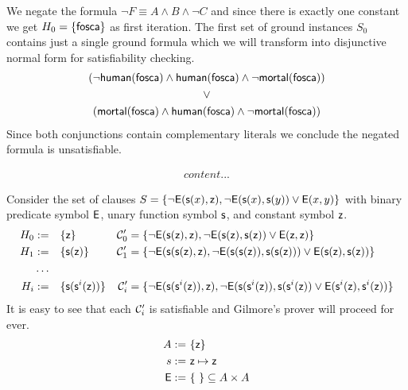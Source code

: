

	We negate the formula $\lnot F \equiv A\land B \land\lnot C$ and since there is exactly one constant we get
	$H_0 = \{ \mathsf{fosca} \}$ as first iteration. The first set of ground instances $S_0$ contains just a single ground formula
	which we will transform into 
	disjunctive normal form for satisfiability checking.
%
\begin{gather*}
(\lnot\mathsf{human}(\mathsf{fosca})\land\mathsf{human}(\mathsf{fosca})\land\lnot\mathsf{mortal}(\mathsf{fosca}))
\\ 
\lor
\\ 
(\mathsf{mortal}(\mathsf{fosca})\land\mathsf{human}(\mathsf{fosca})\land\lnot\mathsf{mortal}(\mathsf{fosca}))
\end{gather*}
Since both conjunctions contain complementary literals we conclude the negated formula is unsatisfiable.


\begin{gather*}
content...
\end{gather*}


\begin{example}
	Consider the set of clauses 
	$S = \{ 
	\lnot{\mathsf{E}}({\mathsf s}(x), {\mathsf z}), 
	\lnot {\mathsf{E}}({\mathsf s}(x), {\mathsf s}(y)) \lor {\mathsf{E}}(x,y)
	\}$ with binary predicate symbol ${\mathsf{E}}$, unary function symbol ${\mathsf s}$, and constant symbol ${\mathsf z}$.
	\begin{align*}
	H_0 :=&\quad \{ {\mathsf z} \} & {\mathcal C}_0' &= \{  
	\lnot{\mathsf{E}}({\mathsf s}({\mathsf z}), {\mathsf z}), 
	\lnot {\mathsf{E}}({\mathsf s}({\mathsf z}), {\mathsf s}({\mathsf z})) \lor {\mathsf{E}}({\mathsf z},{\mathsf z})
	\}
	\\
	H_1 :=&\quad \{ {\mathsf s}({\mathsf z}) \} & {\mathcal C}_1' &= \{ 
		\lnot{\mathsf{E}}({\mathsf s}({\mathsf s}({\mathsf z}), {\mathsf z}),
		\lnot {\mathsf{E}}({\mathsf s}({\mathsf s}({\mathsf z})), {\mathsf s}({\mathsf s}({\mathsf z}))) \lor {\mathsf{E}}({\mathsf s}({\mathsf z}),{\mathsf s}({\mathsf z}))
	 \}
	 \\\ldots
	 \\
	 H_i :=&\quad \{ 
	 {\mathsf s}({\mathsf s}^i({\mathsf z})) \} & {\mathcal C}_i' &= \{  
	 \lnot{\mathsf{E}}({\mathsf s}({\mathsf s}^i({\mathsf z})), {\mathsf z}), 
	 \lnot {\mathsf{E}}({\mathsf s}({\mathsf s}^i({\mathsf z})), {\mathsf s}({\mathsf s}^i({\mathsf z})) \lor {\mathsf{E}}({\mathsf s}^i({\mathsf z}),{\mathsf s}^i({\mathsf z}))
	 \}
	\end{align*} 
	It is easy to see that each ${\mathcal C}_i'$ is satisfiable and Gilmore's prover will proceed for ever.
	\begin{align*}
	A := &\ \{ {\mathsf z} \} \\
	s := &\ {\mathsf z}\mapsto{\mathsf z} \\
	{\mathsf{E}} := &\ \{\ \} \subseteq A\times A
	\end{align*}
\end{example}

